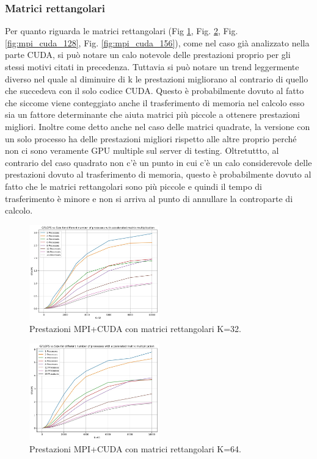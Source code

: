 \documentclass[conference]{IEEEtran}
\begin{document}
\subsubsection{Matrici rettangolari}
Per quanto riguarda le matrici rettangolari (Fig \ref{fig:mpi_cuda_32}, Fig. \ref{fig:mpi_cuda_64}, Fig. \ref{fig:mpi_cuda_128}, Fig. \ref{fig:mpi_cuda_156}), come nel caso già analizzato nella parte CUDA, si può notare un calo notevole delle prestazioni proprio per gli stessi motivi citati in precedenza. Tuttavia si può notare un trend leggermente diverso nel quale al diminuire di k le prestazioni migliorano al contrario di quello che succedeva con il solo codice CUDA. Questo è probabilmente dovuto al fatto che siccome viene conteggiato anche il trasferimento di memoria nel calcolo esso sia un fattore determinante che aiuta matrici più piccole a ottenere prestazioni migliori.
Inoltre come detto anche nel caso delle matrici quadrate, la versione con un solo processo ha delle prestazioni migliori rispetto alle altre proprio perché non ci sono veramente GPU multiple sul server di testing. Oltretuttto, al contrario del caso quadrato non c'è un punto in cui c'è un calo considerevole delle prestazioni dovuto al trasferimento di memoria, questo è probabilmente dovuto al fatto che le matrici rettangolari sono più piccole e quindi il tempo di trasferimento è minore e non si arriva al punto di annullare la controparte di calcolo.
\begin{figure}
    \centering
    \includegraphics[width=0.5\textwidth]{resources/mpi_cuda_32.jpg}
    \caption{Prestazioni MPI+CUDA con matrici rettangolari K=32.}
    \label{fig:mpi_cuda_32}
\end{figure}
\begin{figure}
    \centering
    \includegraphics[width=0.5\textwidth]{resources/mpi_cuda_64.jpg}
    \caption{Prestazioni MPI+CUDA con matrici rettangolari K=64.}
    \label{fig:mpi_cuda_64}
\end{figure}
\end{document}
